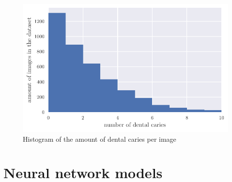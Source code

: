 \begin{figure}
    \includegraphics[width=\linewidth]{images/caries_histogram.pdf}
    \caption{Histogram of the amount of dental caries per image}
    \label{fig:hist_caries_per_img}
\end{figure}

\section{Neural network models}